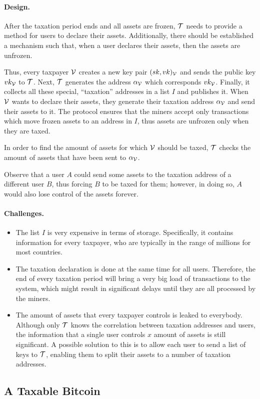 \paragraph{Design.}

After the taxation period ends and all assets are frozen, $\mathcal{T}$ needs to
provide a method for users to declare their assets. Additionally, there should
be established a mechanism such that, when a user declares their assets, then
the assets are unfrozen.

Thus, every taxpayer $\mathcal{V}$ creates a new key pair $(sk, vk)_\mathcal{V}$ and sends
the public key $vk_\mathcal{V}$ to $\mathcal{T}$. Next, $\mathcal{T}$ generates the
address $\alpha_\mathcal{V}$ which corresponds $vk_\mathcal{V}$. Finally, it
collects all these special, ``taxation'' addresses in a list $I$ and publishes
it.  When $\mathcal{V}$ wants to declare their assets, they generate their taxation
address $\alpha_\mathcal{V}$ and send their assets to it. The protocol ensures that
the miners accept only transactions which move frozen assets to an address in
$I$, thus assets are unfrozen only when they are taxed.

In order to find the amount of assets for which $\mathcal{V}$ should be taxed,
$\mathcal{T}$ checks the amount of assets that have been sent to $\alpha_\mathcal{V}$.

Observe that a user $A$ could send some assets to the taxation address of a
different user $B$, thus forcing $B$ to be taxed for them; however, in doing
so, $A$ would also lose control of the assets forever.

\paragraph{Challenges.}

\begin{itemize}
    \item The list $I$ is very expensive in terms of storage. Specifically, it
        contains information for every taxpayer, who are typically in the range
        of millions for most countries.
    \item The taxation declaration is done at the same time for all users.
        Therefore, the end of every taxation period will bring a very big load
        of transactions to the system, which might result in significant delays
        until they are all processed by the miners.
    \item The amount of assets that every taxpayer controls is leaked to
        everybody. Although only $\mathcal{T}$ knows the correlation between
        taxation addresses and users, the information that a single user
        controls \eg $x$ amount of assets is still significant. A possible
        solution to this is to allow each user to send a list of keys to
        $\mathcal{T}$, enabling them to split their assets to a number of taxation
        addresses.
\end{itemize}

\subsection{A Taxable Bitcoin}\label{subsec:tax-bitcoin}
